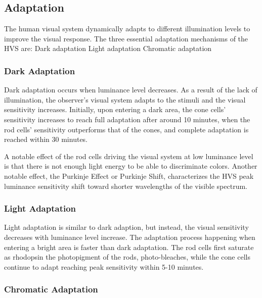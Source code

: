 \subsection{Adaptation}%
\label{subsec:adaptation}

The human visual system dynamically adapts to different illumination levels to improve the visual response. The three essential adaptation mechanisms of the HVS are:
Dark adaptation
Light adaptation
Chromatic adaptation

\subsubsection{Dark Adaptation}%
\label{subsubsec:dark-adaptation}

Dark adaptation occurs when luminance level decreases. As a result of the lack of illumination, the observer’s visual system adapts to the stimuli and the visual sensitivity increases. Initially, upon entering a dark area, the cone cells’ sensitivity increases to reach full adaptation after around 10 minutes, when the rod cells’ sensitivity outperforms that of the cones, and complete adaptation is reached within 30 minutes.

A notable effect of the rod cells driving the visual system at low luminance level is that there is not enough light energy to be able to discriminate colors. Another notable effect,  the Purkinje Effect or Purkinje Shift, characterizes the HVS peak luminance sensitivity shift toward shorter wavelengths of the visible spectrum.

\subsubsection{Light Adaptation}%
\label{subsubsec:light-adaptation}

Light adaptation is similar to dark adaption, but instead, the visual sensitivity decreases with luminance level increase. The adaptation process happening when entering a bright area is faster than dark adaptation. The rod cells first saturate as rhodopsin the photopigment of the rods, photo-bleaches, while the cone cells continue to adapt reaching peak sensitivity within 5-10 minutes.

\subsubsection{Chromatic Adaptation}%
\label{subsubsec:chromatic-adaptation}

